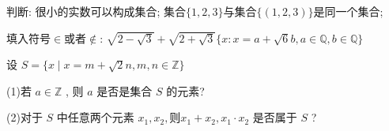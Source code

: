 \documentclass{ctexart}
\begin{document}
\begin{exc}
    判断: 很小的实数可以构成集合; 集合$\{1,2,3\}$与集合$\{(1,2,3)\}$是同一个集合; 
\end{exc}

\begin{exc}
    填入符号$\in$或者$\notin$: $\sqrt{2-\sqrt{3}}+\sqrt{2+\sqrt{3}} $\underline{\quad}$ \{x : x=a+\sqrt{6} b, a \in \mathbb{Q},  b \in \mathbb{Q}\}$
\end{exc}

\begin{exc}
    设  $S=\{x \mid x=m+\sqrt{2} n, m, n \in \mathbb{Z}\}$

(1)若  $a \in \mathbb{Z}$ , 则  $a$  是否是集合  $S$  的元素?

(2)对于  $S$  中任意两个元素  $x_{1} , x_{2} , 则  x_{1}+x_{2} , x_{1} \cdot x_{2}$  是否属于  $S$  ?
\end{exc}
\end{document}
